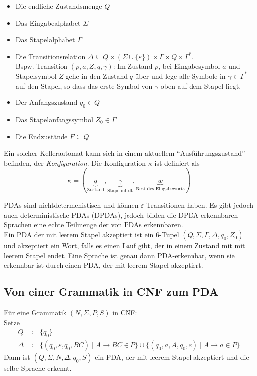 \documentclass[11pt]{scrartcl}
\begin{document}
\begin{itemize}
	\item Die endliche Zustandsmenge $Q$
    \item Das Eingabealphabet $\Sigma$
    \item Das Stapelalphabet $\Gamma$
    \item Die Transitionsrelation $\Delta \subseteq Q \times (\Sigma \cup \{\varepsilon\}) \times \Gamma \times Q \times \Gamma^\ast$.\\
    	  Bspw. Transition $(p,a,Z,q,\gamma)$: Im Zustand $p$, bei Eingabesymbol $a$ und Stapelsymbol $Z$ gehe in den Zustand $q$ über und lege alle Symbole in $\gamma \in \Gamma^\ast$ auf den Stapel, so dass das erste Symbol von $\gamma$ oben auf dem Stapel liegt.
    \item Der Anfangszustand $q_0 \in Q$
    \item Das Stapelanfangssymbol $Z_0 \in \Gamma$
    \item Die Endzustände $F \subseteq Q$
\end{itemize}

Ein solcher Kellerautomat kann sich in einem aktuellem ``Ausführungszustand'' befinden, der \textit{Konfiguration}. Die Konfiguration $\kappa$ ist definiert als $$\kappa = (\underbrace{q}_\textrm{Zustand}, \underbrace{\gamma}_\textrm{Stapelinhalt}, \underbrace{w}_\textrm{Rest des Eingabeworts})$$

PDAs sind nichtdetermenistisch und können $\varepsilon$-Transitionen haben. Es gibt jedoch auch deterministische PDAs (DPDAs), jedoch bilden die DPDA erkennbaren Sprachen eine \underline{echte} Teilmenge der von PDAs erkennbaren.\\

Ein PDA der mit leerem Stapel akzeptiert ist ein 6-Tupel $(Q,\Sigma, \Gamma,\Delta, q_0, Z_0)$ und akzeptiert ein Wort, falls es einen Lauf gibt, der in einem Zustand mit mit leerem Stapel endet. Eine Sprache ist genau dann PDA-erkennbar, wenn sie erkennbar ist durch einen PDA, der mit leerem Stapel akzeptiert.

\subsection{Von einer Grammatik in CNF zum PDA}
Für eine Grammatik $(N, \Sigma, P, S)$ in CNF:\\
Setze
\begin{align*}
	Q &\coloneqq \{q_0\}\\
    \Delta &\coloneqq\{(q_0,\varepsilon,q_0,BC) \mid A \rightarrow BC \in P\} \cup \{(q_0, a, A, q_0, \varepsilon) \mid A \rightarrow a \in P\}
\end{align*}
Dann ist $(Q, \Sigma, N, \Delta, q_0, S)$ ein PDA, der mit leerem Stapel akzeptiert und die selbe Sprache erkennt.
\end{document}
